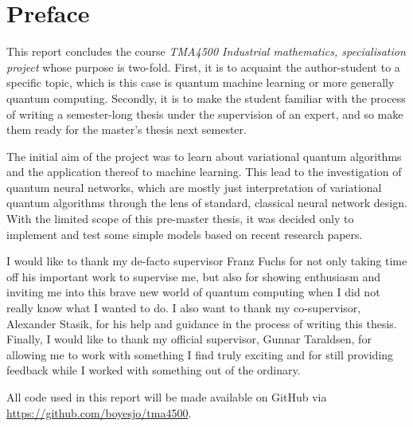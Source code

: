 \section*{Preface}
This report concludes the course \textit{TMA4500 Industrial mathematics, specialisation project} whose purpose is two-fold.
First, it is to acquaint the author-student to a specific topic, which is this case is quantum machine learning or more generally quantum computing.
Secondly, it is to make the student familiar with the process of writing a semester-long thesis under the supervision of an expert, and so make them ready for the master's thesis next semester.

The initial aim of the project was to learn about variational quantum algorithms and the application thereof to machine learning.
This lead to the investigation of quantum neural networks, which are mostly just interpretation of variational quantum algorithms through the lens of standard, classical neural network design.
With the limited scope of this pre-master thesis, it was decided only to implement and test some simple models based on recent research papers.

I would like to thank my de-facto supervisor Franz Fuchs for not only taking time off his important work to supervise me, but also for showing enthusiasm and inviting me into this brave new world of quantum computing when I did not really know what I wanted to do.
I also want to thank my co-supervisor, Alexander Stasik, for his help and guidance in the process of writing this thesis.
Finally, I would like to thank my official supervisor, Gunnar Taraldsen, for allowing me to work with something I find truly exciting and for still providing feedback while I worked with something out of the ordinary.

All code used in this report will be made available on GitHub via \url{https://github.com/boyesjo/tma4500}.



\cleardoublepage